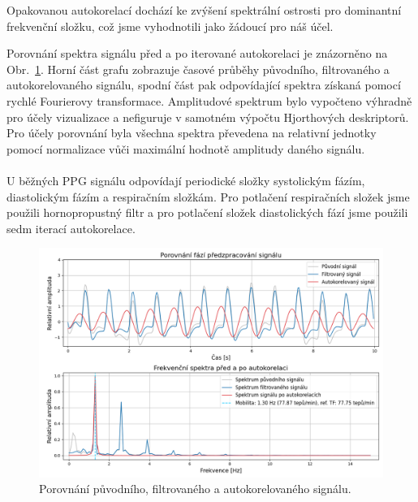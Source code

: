 Opakovanou autokorelací dochází ke zvýšení spektrální ostrosti pro dominantní frekvenční složku, což jsme vyhodnotili jako žádoucí pro náš účel.

Porovnání spektra signálu před a po iterované autokorelaci je znázorněno na Obr.~\ref{fig:hjorth_predzpracovani}.
Horní část grafu zobrazuje časové průběhy původního, filtrovaného a autokorelovaného signálu, spodní část pak odpovídající spektra získaná pomocí rychlé Fourierovy transformace.
Amplitudové spektrum bylo vypočteno výhradně pro účely vizualizace a nefiguruje v samotném výpočtu Hjorthových deskriptorů.
Pro účely porovnání byla všechna spektra převedena na relativní jednotky pomocí normalizace vůči maximální hodnotě amplitudy daného signálu.

\paragraph{}
U běžných \acs{PPG} signálu odpovídají periodické složky systolickým fázím, diastolickým fázím a respiračním složkám.
Pro potlačení respiračních složek jsme použili hornopropustný filtr a pro potlačení složek diastolických fází jsme použili sedm iterací autokorelace.

\begin{figure}[!th]
	\centering
	\includegraphics[width=1\textwidth]{./obrazky/hjorth_preprocess.png}
	\caption[Porovnání původního, filtrovaného a autokorelovaného signálu]{Porovnání původního, filtrovaného a autokorelovaného signálu.}
	\label{fig:hjorth_predzpracovani}
\end{figure}

